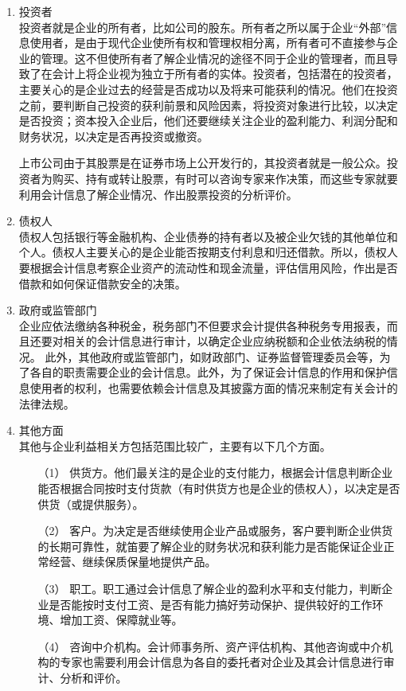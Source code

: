 		\begin{enumerate}
			\item 投资者 \\
						投资者就是企业的所有者，比如公司的股东。所有者之所以属于企业“外部”信息使用者，是由于现代企业使所有权和管理权相分离，所有者可不直接参与企业的管理。这不但使所有者了解企业情况的途径不同于企业的管理者，而且导致了在会计上将企业视为独立于所有者的实体。投资者，包括潜在的投资者，主要关心的是企业过去的经营是否成功以及将来可能获利的情况。他们在投资之前，要判断自己投资的获利前景和风险因素，将投资对象进行比较，以决定是否投资；资本投入企业后，他们还要继续关注企业的盈利能力、利润分配和财务状况，以决定是否再投资或撤资。

						上市公司由于其股票是在证券市场上公开发行的，其投资者就是一般公众。投资者为购买、持有或转让股票，有时可以咨询专家来作决策，而这些专家就要利用会计信息了解企业情况、作出股票投资的分析评价。
			\item 债权人 \\
						债权人包括银行等金融机构、企业债券的持有者以及被企业欠钱的其他单位和个人。债权人主要关心的是企业能否按期支付利息和归还借款。所以，债权人要根据会计信息考察企业资产的流动性和现金流量，评估信用风险，作出是否借款和如何保证借款安全的决策。
			\item 政府或监管部门 \\
						企业应依法缴纳各种税金，税务部门不但要求会计提供各种税务专用报表，而且还要对相关的会计信息进行审计，以确定企业应纳税额和企业依法纳税的情况。
						此外，其他政府或监管部门，如财政部门、证券监督管理委员会等，为了各自的职责需要企业的会计信息。此外，为了保证会计信息的作用和保护信息使用者的权利，也需要依赖会计信息及其披露方面的情况来制定有关会计的法律法规。
			\item 其他方面 \\
						其他与企业利益相关方包括范围比较广，主要有以下几个方面。
						\begin{enumerate}
							\item[（1）] 供货方。他们最关注的是企业的支付能力，根据会计信息判断企业能否根据合同按时支付货款（有时供货方也是企业的债权人），以决定是否供货（或提供服务）。
							\item[（2）] 客户。为决定是否继续使用企业产品或服务，客户要判断企业供货的长期可靠性，就笛要了解企业的财务状况和获利能力是否能保证企业正常经营、继续保质保量地提供产品。
							\item[（3）] 职工。职工通过会计信息了解企业的盈利水平和支付能力，判断企业是否能按时支付工资、是否有能力搞好劳动保护、提供较好的工作环境、增加工资、保障就业等。
							\item[（4）] 咨询中介机构。会计师事务所、资产评估机构、其他咨询或中介机构的专家也需要利用会计信息为各自的委托者对企业及其会计信息进行审计、分析和评价。

\end{enumerate}
\end{enumerate}
